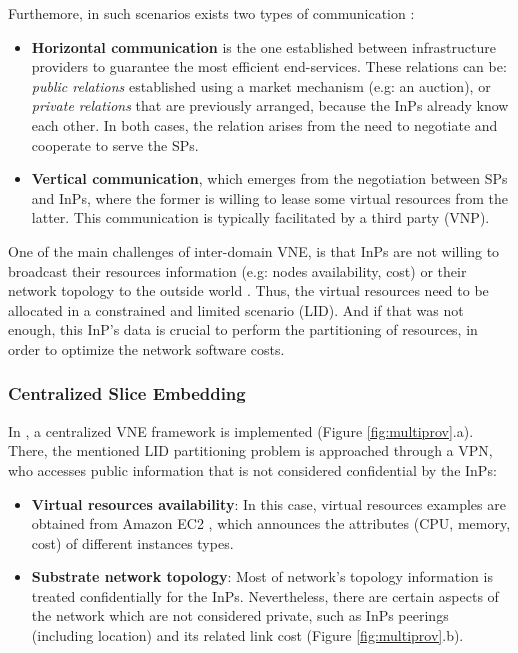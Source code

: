Furthemore, in such scenarios exists two types of communication \citep{zaheer2010multi}:

\begin{itemize}	
	\item \textbf{Horizontal communication} is the one established between infrastructure providers to guarantee the most efficient end-services. These relations can be: \textit{public relations} established using a market mechanism (e.g: an auction), or \textit{private relations} that are previously arranged, because the InPs already know each other. In both cases, the relation arises from the need to negotiate and cooperate to serve the SPs.
	\item \textbf{Vertical communication}, which emerges from the negotiation between SPs and InPs, where the former is willing to lease some virtual resources from the latter. This communication is typically facilitated by a third party (VNP).
\end{itemize}

One of the main challenges of inter-domain VNE, is that InPs are not willing to broadcast their resources information (e.g: nodes availability, cost) or their network topology to the outside world \citep{dietrich2015multi}. Thus, the virtual resources need to be allocated in a constrained and limited scenario (LID). And if that was not enough, this InP's data is crucial to perform the partitioning of resources, in order to optimize the network software costs.

\subsubsection{Centralized Slice Embedding}

In \citep{dietrich2015multi}, a centralized VNE framework is implemented (Figure \ref{fig:multiprov}.a). There, the mentioned LID partitioning problem is approached through a VPN, who accesses public information that is not considered confidential by the InPs:

\begin{itemize}
	\item \textbf{Virtual resources availability}: In this case, virtual resources examples are obtained from Amazon EC2 \cite{amazonEC2}, which announces the attributes (CPU, memory, cost) of different instances types.
	\item \textbf{Substrate network topology}: Most of network's topology information is treated confidentially for the InPs. Nevertheless, there are certain aspects of the network which are not considered private, such as InPs peerings (including location) and its related link cost (Figure \ref{fig:multiprov}.b).
\end{itemize}

